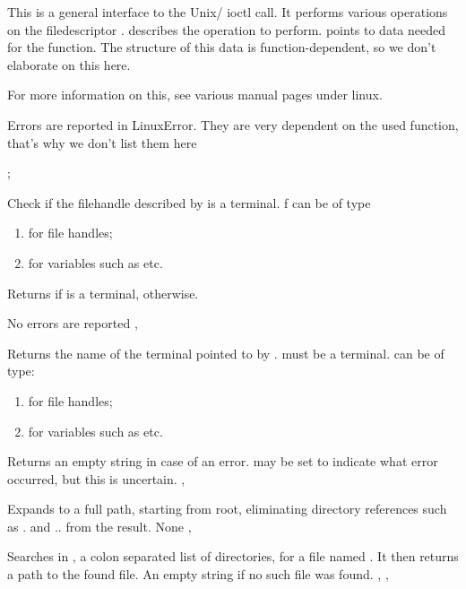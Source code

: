 

{
This is a general interface to the Unix/ \linux ioctl call.
It performs various operations on the filedescriptor .
 describes the operation to perform.
 points to data needed for the  function. 
The structure of this data is function-dependent, so we don't elaborate on
this here. 

For more information on this, see various manual pages under linux.
}
{
Errors are reported in LinuxError. They are very dependent on the used
function, that's why we don't list them here
}
{}



;
{
Check if the filehandle described by  is a terminal.
f can be of type
\begin{enumerate}
\item {} for file handles;
\item {} for  variables such as  etc.
\end{enumerate}

Returns  if  is a terminal,  otherwise.
}
{No errors are reported}
{,}

{
Returns the name of the terminal pointed to by . 
must be a terminal.  can be of type:
\begin{enumerate}
\item {} for file handles;
\item {} for  variables such as  etc.
\end{enumerate}
}
{ Returns an empty string in case of an error.  may be set
 to indicate what error occurred, but this is uncertain.}
{,}

{ Expands  to a full path, starting from root,
eliminating directory references such as . and .. from the result.
}
{None}
{, }



{ Searches in , a colon separated list of directories,
for a file named . It then returns a path to the found file.}
{An empty string if no such file was found.}
{, ,  }

